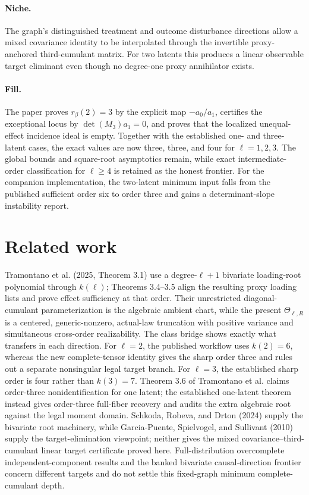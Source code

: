 \documentclass{article}
\begin{document}
\paragraph{Niche.} The graph's distinguished treatment and outcome disturbance directions allow a mixed covariance identity to be interpolated through the invertible proxy-anchored third-cumulant matrix. For two latents this produces a linear observable target eliminant even though no degree-one proxy annihilator exists.

\paragraph{Fill.} The paper proves \(r_\beta(2)=3\) by the explicit map \(-a_0/a_1\), certifies the exceptional locus by \(\det(M_3)a_1=0\), and proves that the localized unequal-effect incidence ideal is empty. Together with the established one- and three-latent cases, the exact values are now three, three, and four for \(\ell=1,2,3\). The global bounds and square-root asymptotics remain, while exact intermediate-order classification for \(\ell\ge4\) is retained as the honest frontier. For the companion implementation, the two-latent minimum input falls from the published sufficient order six to order three and gains a determinant-slope instability report.

\section{Related work}

Tramontano et al. (2025, Theorem 3.1) use a degree-\(\ell+1\) bivariate loading-root polynomial through \(k(\ell)\); Theorems 3.4--3.5 align the resulting proxy loading lists and prove effect sufficiency at that order. Their unrestricted diagonal-cumulant parameterization is the algebraic ambient chart, while the present \(\Theta_{\ell,R}\) is a centered, generic-nonzero, actual-law truncation with positive variance and simultaneous cross-order realizability. The class bridge shows exactly what transfers in each direction. For \(\ell=2\), the published workflow uses \(k(2)=6\), whereas the new complete-tensor identity gives the sharp order three and rules out a separate nonsingular legal target branch. For \(\ell=3\), the established sharp order is four rather than \(k(3)=7\). Theorem 3.6 of Tramontano et al. claims order-three nonidentification for one latent; the established one-latent theorem instead gives order-three full-fiber recovery and audits the extra algebraic root against the legal moment domain. Schkoda, Robeva, and Drton (2024) supply the bivariate root machinery, while Garcia-Puente, Spielvogel, and Sullivant (2010) supply the target-elimination viewpoint; neither gives the mixed covariance--third-cumulant linear target certificate proved here. Full-distribution overcomplete independent-component results and the banked bivariate causal-direction frontier concern different targets and do not settle this fixed-graph minimum complete-cumulant depth.
\end{document}
